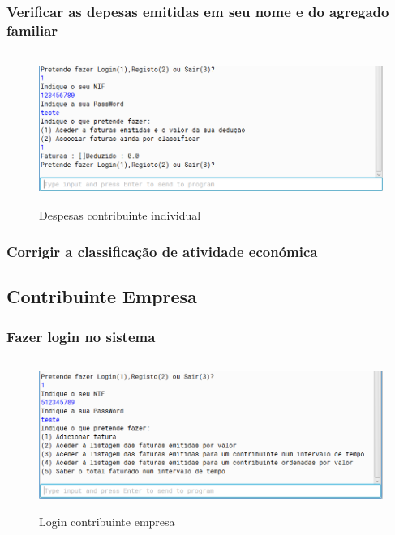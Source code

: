 \documentclass[a4paper]{article}
\begin{document}
		\subsubsection{Verificar as depesas emitidas em seu nome e do agregado familiar}
			\begin{figure}[htbp]
				\centering
				\includegraphics[width = 320pt,height = 140pt]{faturaemitidasci.png}
				\caption{Despesas contribuinte individual}
			\end{figure}

		\subsubsection{Corrigir a classificação de atividade económica}

\pagebreak

	\subsection{Contribuinte Empresa}

		\subsubsection{Fazer login no sistema}
			\begin{figure}[htbp]
				\centering
				\includegraphics[width = 320pt,height = 140pt]{loginempresa.png}
				\caption{Login contribuinte empresa}
			\end{figure}
\end{document}
